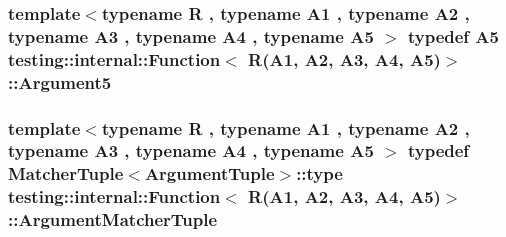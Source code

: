 \subsubsection[{\texorpdfstring{Argument5}{Argument5}}]{\setlength{\rightskip}{0pt plus 5cm}template$<$typename R , typename A1 , typename A2 , typename A3 , typename A4 , typename A5 $>$ typedef A5 {\bf testing\+::internal\+::\+Function}$<$ R(A1, A2, A3, A4, A5)$>$\+::{\bf Argument5}}\hypertarget{structtesting_1_1internal_1_1_function_3_01_r_07_a1_00_01_a2_00_01_a3_00_01_a4_00_01_a5_08_4_a5bc0279c43aa98c409219dee1b815c71}{}\label{structtesting_1_1internal_1_1_function_3_01_r_07_a1_00_01_a2_00_01_a3_00_01_a4_00_01_a5_08_4_a5bc0279c43aa98c409219dee1b815c71}
\subsubsection[{\texorpdfstring{Argument\+Matcher\+Tuple}{ArgumentMatcherTuple}}]{\setlength{\rightskip}{0pt plus 5cm}template$<$typename R , typename A1 , typename A2 , typename A3 , typename A4 , typename A5 $>$ typedef {\bf Matcher\+Tuple}$<${\bf Argument\+Tuple}$>$\+::type {\bf testing\+::internal\+::\+Function}$<$ R(A1, A2, A3, A4, A5)$>$\+::{\bf Argument\+Matcher\+Tuple}}\hypertarget{structtesting_1_1internal_1_1_function_3_01_r_07_a1_00_01_a2_00_01_a3_00_01_a4_00_01_a5_08_4_a03c18380538e53141227afe6d0f20cc8}{}\label{structtesting_1_1internal_1_1_function_3_01_r_07_a1_00_01_a2_00_01_a3_00_01_a4_00_01_a5_08_4_a03c18380538e53141227afe6d0f20cc8}
